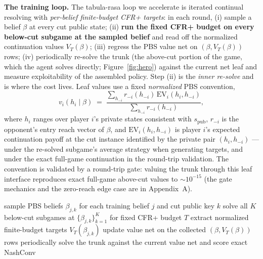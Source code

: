 \documentclass[11pt]{article}
\begin{document}
\textbf{The training loop.} The tabula-rasa loop we accelerate is iterated continual
resolving with \emph{per-belief finite-budget CFR+ targets}: in each round, (i) sample a
belief $\beta$ at every cut public state; (ii) \textbf{run the fixed CFR+ budget on
every below-cut subgame at the sampled belief} and read off the normalized continuation
values $V_T(\beta)$; (iii) regress the PBS value net on $(\beta, V_T(\beta))$ rows; (iv)
periodically re-solve the trunk (the above-cut portion of the game, which the agent
solves directly; Figure~\ref{fig:hero}) against the current net leaf and measure
exploitability of the assembled policy. Step (ii) is the \emph{inner re-solve} and is where the cost
lives. Leaf values use a fixed \emph{normalized} PBS convention,
\[ v_i(h_i \mid \beta) \;=\; \frac{\sum_{h_{-i}} r_{-i}(h_{-i})\, \mathrm{EV}_i(h_i,
h_{-i})}{\sum_{h_{-i}} r_{-i}(h_{-i})}, \]
where $h_i$ ranges over player $i$'s private states consistent with $s_{\text{pub}}$,
$r_{-i}$ is the opponent's entry reach vector of $\beta$, and $\mathrm{EV}_i(h_i,
h_{-i})$ is player $i$'s expected continuation payoff at the cut instance identified by
the private pair $(h_i, h_{-i})$ --- under the re-solved subgame's average strategy when
generating targets, and under the exact full-game continuation in the round-trip
validation. The convention is validated by a round-trip gate: valuing the trunk through
this leaf interface reproduces exact full-game above-cut values to $\sim 10^{-15}$ (the
gate mechanics and the zero-reach edge case are in Appendix~A).

\begin{algorithm}[t]
\caption{Iterated resolving with population-fused target generation}
\label{alg:trainingloop}
\begin{algorithmic}[1]
  \State sample PBS beliefs $\beta_{j,k}$ for each training belief $j$ and cut public
         key $k$
    \State solve all $K$ below-cut subgames at $\{\beta_{j,k}\}_{k=1}^K$ for fixed CFR+
           budget $T$
    \State extract normalized finite-budget targets $V_T(\beta_{j,k})$
  \EndFor
  \State update value net on the collected $(\beta,V_T(\beta))$ rows
  \State periodically solve the trunk against the current value net and score exact
         NashConv
\EndFor
\end{algorithmic}
\end{algorithm}
\end{document}
